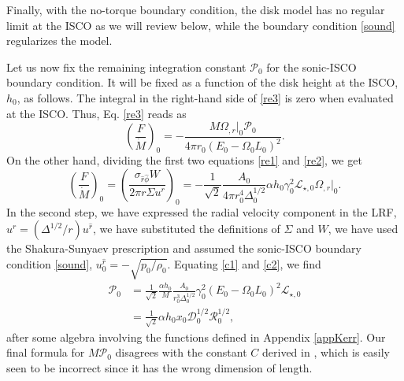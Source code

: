 \documentclass[a4paper,fleqn,usenatbib]{mnrasMOD}
\numberwithin{equation}{section}
\newcommand{\be}{\begin{equation}}
\newcommand{\ee}{\end{equation}}
\begin{document}
Finally, with the no-torque boundary condition, the disk model has no regular limit at the ISCO as we will review below, while the boundary condition \eqref{sound} regularizes the model. 

Let us now fix the remaining integration constant $\mathcal P_0$ for the sonic-ISCO boundary condition. It will be fixed as a function of the disk height at the ISCO, $h_0$, as follows. The integral in the right-hand side of \eqref{re3} is zero when evaluated at the ISCO. Thus, Eq. \eqref{re3} reads as
\be \label{c1}
\left(\frac{F}{\dot{M}}\right)_0 = - \frac{M \Omega_{,r}|_0 \mathcal P_0}{4\pi r_0(E_0 - \Omega_0 L_0)^2}.
\ee
On the other hand, dividing the first two equations \eqref{re1} and \eqref{re2}, we get
\be \label{c2}
\left(\frac{F}{\dot{M}}\right)_0 = \left(\frac{\sigma_{\hat{r}\hat{\phi}} W}{2 \pi r \Sigma u^{r}}\right)_0 =  - \frac{1}{\sqrt{2}} \frac{A_0}{4\pi r^{4}_0 \Delta_0^{1/2}}\alpha h_0\gamma^2_0\mathcal{L}_{\star,0}\Omega_{,r}|_0.
\ee
In the second step, we have expressed the radial velocity component in the LRF, $u^{r} = (\Delta^{1/2}/ r) u^{\hat{r}}$, we have substituted the definitions of $\Sigma$ and $W$, we have used the Shakura-Sunyaev prescription and assumed the sonic-ISCO boundary condition \eqref{sound}, $u^{\hat{r}}_{0} = -\sqrt{p_0 /\rho_0}$. Equating \eqref{c1} and \eqref{c2}, we find
\begin{align} \label{C}
\mathcal P_0 &= \frac{1}{\sqrt{2}} \frac{\alpha h_0}{M} \frac{A_0}{r^3_0 \Delta^{1/2}_0} \gamma^2_0 (E_0 - \Omega_0 L_0)^2 \mathcal{L}_{\star,0}  \nonumber\\
& = \frac{1}{\sqrt{2}}  \alpha h_0 x_0 \mathcal{D}^{1/2}_{0} \mathcal{R}^{1/2}_{0},
\end{align}
after some algebra involving the functions defined in Appendix \ref{appKerr}. Our final formula for $M \mathcal P_0$ disagrees with the constant $C$ derived in \cite{Penna:2011rw}, which is easily seen to be incorrect since it has the wrong dimension of length. 
\end{document}
